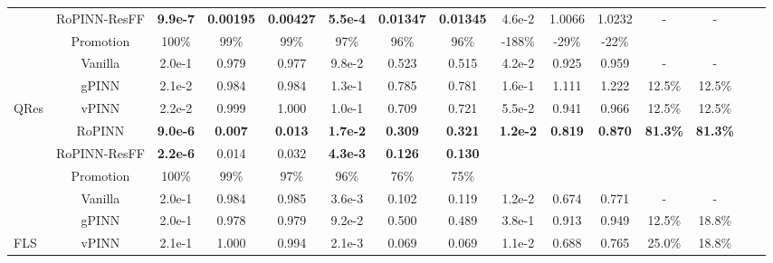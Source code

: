 \begin{table}[t]
\begin{small}
\begin{tabular}{lcccccccccccccc}
                     \cmidrule(lr){2-13}
                     & RoPINN-ResFF & \textbf{9.9e-7} & \textbf{0.00195} & \textbf{0.00427} & \textbf{5.5e-4} & \textbf{0.01347} & \textbf{0.01345} & 4.6e-2 & 1.0066 & 1.0232 & - & - \\
                     & Promotion & 100\% & 99\% & 99\% & 97\% & 96\% & 96\% & -188\% & -29\% & -22\% &  & \\
                    \midrule
                     & Vanilla & 2.0e-1  & 0.979 & 0.977 & 9.8e-2 & 0.523 & 0.515 & 4.2e-2 & 0.925 & 0.959 & - & -\\
                     & gPINN & 2.1e-2 & 0.984 & 0.984 & 1.3e-1 & 0.785 & 0.781 & 1.6e-1 & 1.111 & 1.222 & 12.5\% & 12.5\% \\
                    QRes \cite{bu2021quadratic} & vPINN & 2.2e-2 & 0.999 & 1.000 & 1.0e-1 & 0.709 & 0.721 & 5.5e-2 & 0.941 & 0.966 & 12.5\% & 12.5\%\\
                     & RoPINN & \cellcolor{tablelightblue}\textbf{9.0e-6} & \cellcolor{tablelightblue}\textbf{0.007} & \cellcolor{tablelightblue}\textbf{0.013} & \cellcolor{tablelightblue}\textbf{1.7e-2} & \cellcolor{tablelightblue}\textbf{0.309} & \cellcolor{tablelightblue}\textbf{0.321} & \cellcolor{tablelightblue}\textbf{1.2e-2} & \cellcolor{tablelightblue}\textbf{0.819} & \cellcolor{tablelightblue}\textbf{0.870} & \multirow{2}{*}{\textbf{81.3\%}} & \multirow{2}{*}{\textbf{81.3\%}}\\
                     \cmidrule(lr){2-13}
                     & RoPINN-ResFF & \cellcolor{tablelightblue}\textbf{2.2e-6} & \cellcolor{tablelightblue}0.014 & \cellcolor{tablelightblue}0.032 & \cellcolor{tablelightblue}\textbf{4.3e-3} & \cellcolor{tablelightblue}\textbf{0.126} & \cellcolor{tablelightblue}\textbf{0.130} &  &  &  &  &  \\
                     & Promotion & 100\% & 99\% & 97\% & 96\% & 76\% & 75\% &  &  &  &  & \\
                    \midrule
                     & Vanilla & 2.0e-1 & 0.984 & 0.985 & 3.6e-3 & 0.102 & 0.119 & 1.2e-2 & 0.674 & 0.771 & - & -\\
                     & gPINN & 2.0e-1 & \cellcolor{tablelightblue}0.978 & \cellcolor{tablelightblue}0.979 & 9.2e-2 & 0.500 & 0.489 & 3.8e-1 & 0.913 & 0.949 & 12.5\% & 18.8\%  \\
                    FLS \cite{wong2022learning} & vPINN & 2.1e-1 & 1.000 & 0.994 & \cellcolor{tablelightblue}2.1e-3 & \cellcolor{tablelightblue}0.069 & \cellcolor{tablelightblue}0.069 & \cellcolor{tablelightblue}1.1e-2 & 0.688 & \cellcolor{tablelightblue}0.765 & 25.0\% & 18.8\%\\

\end{tabular}
\end{small}
\end{table}
